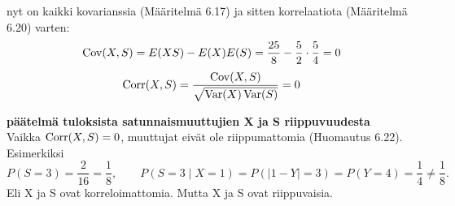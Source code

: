 \documentclass[12pt,a4paper]{article}
\begin{document}
\pagebreak
nyt on kaikki kovarianssia (Määritelmä 6.17) ja sitten korrelaatiota (Määritelmä 6.20) varten:
\[
\operatorname{Cov}(X,S)=E(XS)-E(X)E(S)
=\frac{25}{8}-\frac52\cdot\frac54=0
\]
\[
\operatorname{Corr}(X,S)=\frac{\operatorname{Cov}(X,S)}{\sqrt{\operatorname{Var}(X)\operatorname{Var}(S)}}=0
\]

\vspace{0.8cm}

\textbf{päätelmä tuloksista satunnaismuuttujien X ja S riippuvuudesta}\\

Vaikka $\operatorname{Corr}(X,S)=0$, muuttujat eivät ole riippumattomia (Huomautus 6.22).\\

Esimerkiksi
\[
P(S=3)=\frac{2}{16}=\frac18,\qquad
P(S=3\mid X=1)=P(|1-Y|=3)=P(Y=4)=\frac14\neq \frac18.
\]
Eli X ja S ovat korreloimattomia. Mutta X ja S ovat riippuvaisia.
\end{document}

